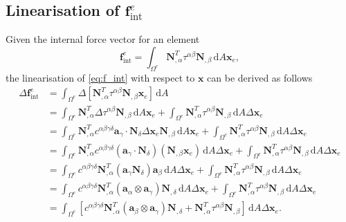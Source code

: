 


\subsection{Linearisation of \texorpdfstring{$\mathbf{f}_{\text{int}}^{e}$}{Internal Force Vector}}
Given the internal force vector for an element
\begin{equation}\label{eq:f_int}
    \mathbf{f}_{\mathrm{int}}^{e} = \int_{\Omega^{e}} \mathbf{N}^{T}_{, \alpha} \tau^{\alpha \beta} \mathbf{N}_{, \beta} \, \mathrm{d} A \mathbf{x}_{e},
    \end{equation}
the linearisation of \eqref{eq:f_int} with respect to $\mathbf{x}$ can be derived as follows
    \begin{equation}\label{eq:del_f_int}
        \begin{split}
        \Delta \mathbf{f}_{\mathrm{int}}^{e} &= \int_{\Omega^{e}} \Delta \left[\mathbf{N}^{T}_{, \alpha} \tau^{\alpha \beta} \mathbf{N}_{, \beta} \mathbf{x}_{e}\right] \, \mathrm{d} A \\ 
        &= \int_{\Omega^{e}} \mathbf{N}^{T}_{, \alpha} \Delta \tau^{\alpha \beta} \mathbf{N}_{, \beta} \, \mathrm{d} A \mathbf{x}_{e} + \int_{\Omega^{e}} \mathbf{N}_{, \alpha}^{T} \tau^{\alpha \beta} \mathbf{N}_{, \beta} \, \mathrm{d} A \Delta \mathbf{x}_{e} \\ &= \int_{\Omega^{e}} \mathbf{N}_{, \alpha}^{T} c^{\alpha \beta \gamma \delta} \boldsymbol{a}_{\gamma} \cdot \mathbf{N}_{\delta} \Delta \mathbf{x}_{e} \mathbf{N}_{, \beta} \, \mathrm{d} A \mathbf{x}_{e} + \int_{\Omega^{e}} \mathbf{N}_{, \alpha}^{T} \tau^{\alpha \beta} \mathbf{N}_{, \beta} \, \mathrm{d} A \Delta \mathbf{x}_{e} \\ &= \int_{\Omega^{e}} \mathbf{N}^{T}_{,\alpha} c^{\alpha \beta \gamma \delta} \left( \boldsymbol{a}_{\gamma} \cdot \mathbf{N}_{\delta} \right) \left( \mathbf{N}_{, \beta} \mathbf{x}_{e} \right) \, \mathrm{d} A \Delta \mathbf{x}_{e} + \int_{\Omega^{e}} \mathbf{N}_{, \alpha}^{T} \tau^{\alpha \beta} \mathbf{N}_{, \beta} \, \mathrm{d} A \Delta \mathbf{x}_{e} \\ &= \int_{\Omega^{e}} c^{\alpha \beta \gamma \delta} \mathbf{N}_{, \alpha}^{T} \left( \boldsymbol{a}_{\gamma} \mathbf{N}_{\delta} \right) \boldsymbol{a}_{\beta} \, \mathrm{d} A \Delta \mathbf{x}_{e} + \int_{\Omega^{e}} \mathbf{N}_{, \alpha}^{T} \tau^{\alpha \beta} \mathbf{N}_{, \beta} \, \mathrm{d} A \Delta \mathbf{x}_{e} \\ &= \int_{\Omega^{e}} c^{\alpha \beta \gamma \delta} \mathbf{N}_{, \alpha}^{T} \left( \boldsymbol{a}_{\alpha} \otimes \boldsymbol{a}_{\gamma} \right) \mathbf{N}_{, \delta} \, \mathrm{d} A \Delta \mathbf{x}_{e} + \int_{\Omega^{e}} \mathbf{N}_{, \alpha}^{T} \tau^{\alpha \beta} \mathbf{N}_{, \beta} \, \mathrm{d} A \Delta \mathbf{x}_{e}\\
        &= \int_{\Omega^{e}} \left[ c^{\alpha \beta \gamma \delta} \mathbf{N}_{, \alpha}^{T} \left( \boldsymbol{a}_{\beta} \otimes \boldsymbol{a}_{\gamma} \right) \mathbf{N}_{, \delta} + \mathbf{N}_{, \alpha}^{T} \tau^{\alpha \beta} \mathbf{N}_{, \beta} \right] \, \mathrm{d} A \Delta \mathbf{x}_{e}.
        \end{split}
    \end{equation}


